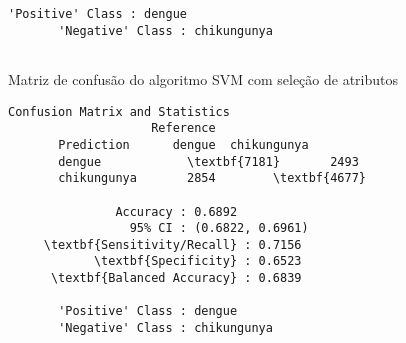 \begin{apendicesenv}
\begin{quadro}
\begin{Verbatim}[commandchars=\\\{\}]
       'Positive' Class : dengue 
       'Negative' Class : chikungunya
  
    \end{Verbatim}  
\endgroup
{}
\end{quadro}


\begin{quadro}
\caption{\label{quadro:naive2}Matriz de confusão do algoritmo SVM com seleção de atributos}
\begingroup
    \fontsize{10pt}{9pt}\selectfont
    \begin{Verbatim}[commandchars=\\\{\}]
      Confusion Matrix and Statistics
                    Reference
       Prediction      dengue  chikungunya
       dengue            \textbf{7181}       2493
       chikungunya       2854        \textbf{4677}
                                         
               Accuracy : 0.6892         
                 95% CI : (0.6822, 0.6961)      
     \textbf{Sensitivity/Recall} : 0.7156         
            \textbf{Specificity} : 0.6523         
      \textbf{Balanced Accuracy} : 0.6839
         
       'Positive' Class : dengue 
       'Negative' Class : chikungunya
  
    \end{Verbatim}  
\endgroup
{}
\end{quadro}


\end{apendicesenv}
